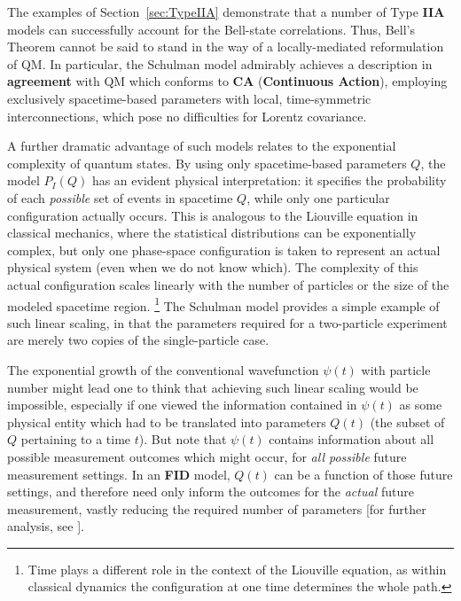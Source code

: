 \documentclass[onecolumn, nofootinbib, 12pt]{revtex4-1}
\begin{document}
The examples of Section~\ref{sec:TypeIIA} demonstrate that a number of Type {\bf IIA} models can successfully account for the Bell-state correlations.  Thus, Bell's Theorem cannot be said to stand in the way of a locally-mediated reformulation of QM\@. In particular, the Schulman model admirably achieves a description in {\bf agreement} with QM which conforms to {\bf CA} ({\bf Continuous Action}), employing exclusively spacetime-based parameters with local, time-symmetric interconnections, which pose no difficulties for Lorentz covariance. 

A further dramatic advantage of such models relates to the exponential complexity of quantum states.  By using only spacetime-based parameters $Q$, the model $P_I(Q)$ has an evident physical interpretation: it specifies the probability of each \emph{possible} set of events in spacetime $Q$, while only one particular configuration actually occurs.  This is analogous to the Liouville equation in classical mechanics, where the statistical distributions can be exponentially complex, but only one phase-space configuration is taken to represent an actual physical system (even when we do not know which).  The complexity of this actual configuration scales linearly with the number of particles or the size of the modeled spacetime region.%
\footnote{Time plays a different role in the context of the Liouville equation, as within classical dynamics the configuration at one time determines the whole path.}
The Schulman model provides a simple example of such linear scaling, in that the parameters required for a two-particle experiment are merely two copies of the single-particle case. 

The exponential growth of the conventional wavefunction $\psi(t)$ with particle number might lead one to think 
that achieving such linear scaling would be impossible, especially if one viewed the information contained in $\psi(t)$ as some physical entity which had to be translated into parameters $Q(t)$ (the subset of $Q$ pertaining to a time $t$).  But note that $\psi(t)$ contains information about all possible measurement outcomes which might occur, for \emph{all possible} future measurement settings.  In an {\bf FID} model, $Q(t)$ can be a function of those future settings, and therefore need only inform the outcomes for the \emph{actual} future measurement, vastly reducing the required number of parameters [for further analysis, see \textcite{wharton2014}].
\end{document}
